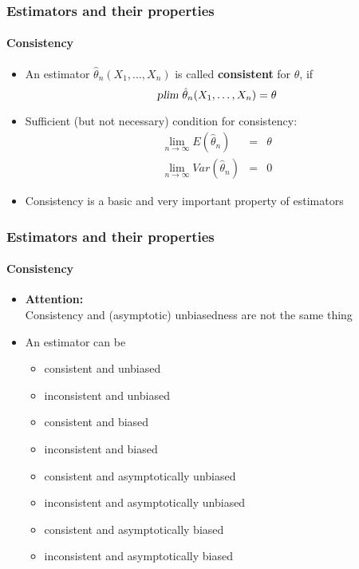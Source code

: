 \documentclass[notes=show]{beamer}
\begin{document}
\begin{frame}\frametitle{Estimators and their properties}\framesubtitle{Consistency}
\begin{itemize}
    \item An estimator $\hat{\theta}_{n}(X_{1},\ldots ,X_{n})$ is called \textbf{consistent} for $\theta $, if
        \begin{equation*}
            \textsl{plim}~\hat{\theta}_{n}(X_{1},\ldots ,X_{n})=\theta
        \end{equation*}
    \item Sufficient (but not necessary) condition for consistency:
    \begin{eqnarray*}
        \lim_{n\rightarrow \infty }E(\hat{\theta}_{n}) &=&\theta \\
        \lim_{n\rightarrow \infty }Var(\hat{\theta}_{n}) &=&0
    \end{eqnarray*}
    \item Consistency is a basic and very important property of estimators
\end{itemize}
\end{frame}


\begin{frame}\frametitle{Estimators and their properties}\framesubtitle{Consistency}
\begin{itemize}
    \item \textbf{Attention:\\} Consistency and (asymptotic) unbiasedness are not the same thing
    \item An estimator can be
    \begin{itemize}
        \item consistent and unbiased
        \item inconsistent and unbiased
        \item consistent and biased
        \item inconsistent and biased
        \item consistent and asymptotically unbiased
        \item inconsistent and asymptotically unbiased
        \item consistent and asymptotically biased
        \item inconsistent and asymptotically biased
    \end{itemize}
\end{itemize}
\end{frame}
\end{document}
